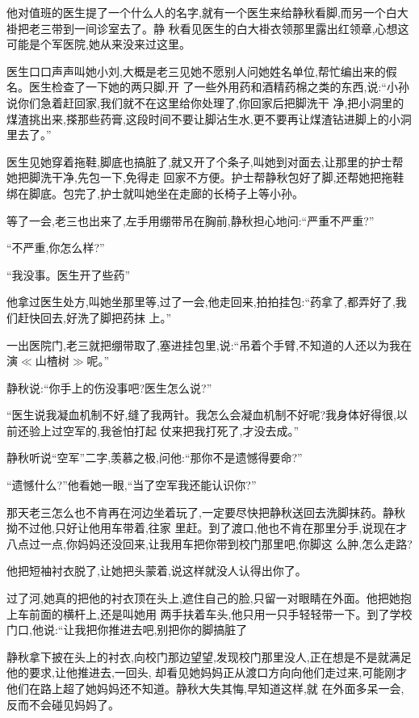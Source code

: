 ﻿\documentclass[12pt]{article}
\begin{document}
他对值班的医生提了一个什么人的名字,就有一个医生来给静秋看脚,而另一个白大褂把老三带到一间诊室去了。静
秋看见医生的白大褂衣领那里露出红领章,心想这可能是个军医院,她从来没来过这里。

医生口口声声叫她小刘,大概是老三见她不愿别人问她姓名单位,帮忙编出来的假名。医生检查了一下她的两只脚,开
了一些外用药和酒精药棉之类的东西,说:``小孙说你们急着赶回家,我们就不在这里给你处理了,你回家后把脚洗干
净,把小洞里的煤渣挑出来,搽那些药膏,这段时间不要让脚沾生水,更不要再让煤渣钻进脚上的小洞里去了。''

医生见她穿着拖鞋,脚底也搞脏了,就又开了个条子,叫她到对面去,让那里的护士帮她把脚洗干净,先包一下,免得走
回家不方便。护士帮静秋包好了脚,还帮她把拖鞋绑在脚底。包完了,护士就叫她坐在走廊的长椅子上等小孙。

等了一会,老三也出来了,左手用绷带吊在胸前,静秋担心地问:``严重不严重?''

``不严重,你怎么样?''

``我没事。医生开了些药\myrule ''

他拿过医生处方,叫她坐那里等,过了一会,他走回来,拍拍挂包:``药拿了,都弄好了,我们赶快回去,好洗了脚把药抹
上。''

一出医院门,老三就把绷带取了,塞进挂包里,说:``吊着个手臂,不知道的人还以为我在演$\ll$山楂树$\gg$呢。''

静秋说:``你手上的伤没事吧?医生怎么说?''

``医生说我凝血机制不好,缝了我两针。我怎么会凝血机制不好呢?我身体好得很,以前还验上过空军的,我爸怕打起
仗来把我打死了,才没去成。''

静秋听说``空军''二字,羡慕之极,问他:``那你不是遗憾得要命?''

``遗憾什么?''他看她一眼,``当了空军我还能认识你?''

那天老三怎么也不肯再在河边坐着玩了,一定要尽快把静秋送回去洗脚抹药。静秋拗不过他,只好让他用车带着,往家
里赶。到了渡口,他也不肯在那里分手,说现在才八点过一点,你妈妈还没回来,让我用车把你带到校门那里吧,你脚这
么肿,怎么走路?

他把短袖衬衣脱了,让她把头蒙着,说这样就没人认得出你了。

过了河,她真的把他的衬衣顶在头上,遮住自己的脸,只留一对眼睛在外面。他把她抱上车前面的横杆上,还是叫她用
两手扶着车头,他只用一只手轻轻带一下。到了学校门口,他说:``让我把你推进去吧,别把你的脚搞脏了\myrule 

静秋拿下披在头上的衬衣,向校门那边望望,发现校门那里没人,正在想是不是就满足他的要求,让他推进去,一回头,
却看见她妈妈正从渡口方向向他们走过来,可能刚才他们在路上超了她妈妈还不知道。静秋大失其悔,早知道这样,就
在外面多呆一会,反而不会碰见妈妈了。
\end{document}
